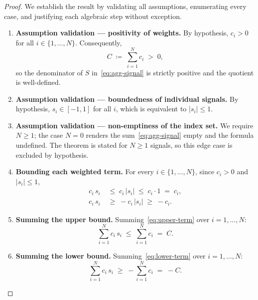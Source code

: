 \documentclass[12pt,openany]{book}
\numberwithin{equation}{chapter}
\theoremstyle{plain}
\theoremstyle{definition}
\theoremstyle{remark}
\numberwithin{equation}{chapter}
\theoremstyle{plain}
\begin{document}
\begin{proof}
We establish the result by validating all assumptions, enumerating every
case, and justifying each algebraic step without exception.

\begin{enumerate}
  \item \textbf{Assumption validation --- positivity of weights.}
        By hypothesis, $c_i > 0$ for all $i \in \{1,\dots,N\}$.
        Consequently,
        \begin{equation}
          C \;\coloneqq\; \sum_{i=1}^{N} c_i \;>\; 0,
          \label{eq:C-pos}
        \end{equation}
        so the denominator of $S$ in~\eqref{eq:agg-signal} is strictly
        positive and the quotient is well-defined.

  \item \textbf{Assumption validation --- boundedness of individual signals.}
        By hypothesis, $s_i \in [-1, 1]$ for all $i$, which is equivalent
        to $|s_i| \leq 1$.

  \item \textbf{Assumption validation --- non-emptiness of the index set.}
        We require $N \geq 1$; the case $N = 0$ renders the
        sum~\eqref{eq:agg-signal} empty and the formula undefined.
        The theorem is stated for $N \geq 1$ signals, so this edge case
        is excluded by hypothesis.

  \item \textbf{Bounding each weighted term.}
        For every $i \in \{1,\dots,N\}$, since $c_i > 0$ and
        $|s_i| \leq 1$,
        \begin{align}
          c_i\,s_i &\;\leq\; c_i\,|s_i| \;\leq\; c_i \cdot 1 \;=\; c_i,
          \label{eq:upper-term}\\
          c_i\,s_i &\;\geq\; -c_i\,|s_i| \;\geq\; -c_i.
          \label{eq:lower-term}
        \end{align}

  \item \textbf{Summing the upper bound.}
        Summing~\eqref{eq:upper-term} over $i = 1,\dots,N$:
        \begin{equation}
          \sum_{i=1}^{N} c_i\,s_i
            \;\leq\; \sum_{i=1}^{N} c_i \;=\; C.
          \label{eq:sum-upper}
        \end{equation}

  \item \textbf{Summing the lower bound.}
        Summing~\eqref{eq:lower-term} over $i = 1,\dots,N$:
        \begin{equation}
          \sum_{i=1}^{N} c_i\,s_i
            \;\geq\; -\sum_{i=1}^{N} c_i \;=\; -C.
          \label{eq:sum-lower}
        \end{equation}


\end{enumerate}
\end{proof}
\end{document}
